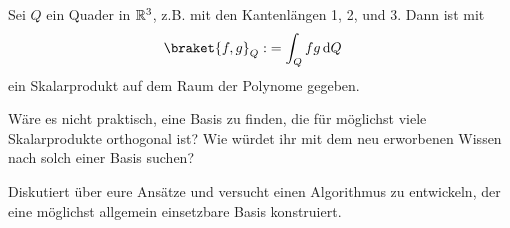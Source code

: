\begin{example}
	Sei $Q$ ein Quader in $\mathbb{R}^3$, z.B. mit den Kantenlängen 1, 2, und 3. Dann ist mit 
	\begin{align*}
		\braket{f,g}_Q :&= \int_Q f g \dd Q
	\end{align*}
	ein Skalarprodukt auf dem Raum der Polynome gegeben.
\end{example}

\begin{centralquestion}
Wäre es nicht praktisch, eine Basis zu finden, die für möglichst viele Skalarprodukte orthogonal ist? Wie würdet ihr mit dem neu erworbenen Wissen nach solch einer Basis suchen?

Diskutiert über eure Ansätze und versucht einen Algorithmus zu entwickeln, der eine möglichst allgemein einsetzbare Basis konstruiert.
\end{centralquestion}

